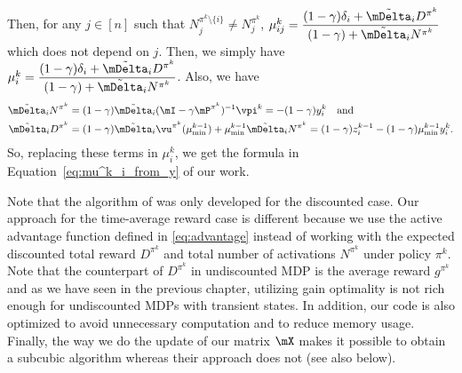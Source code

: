 Then, for any $j\in[n]$ such that $N_j^{\pi^k\setminus\{i\}}\neq N_j^{\pi^k}$, $\mu^k_{ij}=\displaystyle\frac{(1-\gamma)\delta_i +\tilde{\mDelta}_iD^{\pi^k}}{(1-\gamma) +\tilde{\mDelta}_iN^{\pi^k}}$ which does not depend on $j$.
Then, we simply have ${\mu^k_i=\displaystyle\frac{(1-\gamma)\delta_i +\tilde{\mDelta}_iD^{\pi^k}}{(1-\gamma) +\tilde{\mDelta}_iN^{\pi^k}}}$. %
Also, we have 
\begin{align*}
    \tilde{\mDelta}_iN^{\pi^k}&=(1-\gamma)\tilde{\mDelta}_i(\mI-\gamma \mP^{\pi^k})^{-1}\vpi^k=-(1-\gamma)y^k_i \quad\text{and}\\
    \tilde{\mDelta}_iD^{\pi^k}&={(1-\gamma)\tilde{\mDelta}_i\vu^{\pi^k}(\mu^{k-1}_{\min}) +\mu^{k-1}_{\min}\tilde{\mDelta}_i N^{\pi^k}} =(1-\gamma)z^{k-1}_i -(1-\gamma)\mu^{k-1}_{\min}y^k_i.
\end{align*}
So, replacing these terms in $\mu^k_i$, we get the formula in Equation~\eqref{eq:mu^k_i_from_y} of our work.

Note that the algorithm of \cite{akbarzadeh2020conditions} was only developed for the discounted case.  Our approach for the time-average reward case is different because we use the active advantage function defined in \eqref{eq:advantage} instead of working with the expected discounted total reward $D^{\pi^k}$ and total number of activations $N^{\pi^k}$ under policy $\pi^k$. 
Note that the counterpart of $D^{\pi^k}$ in undiscounted MDP is the average reward $g^{\pi^k}$ and as we have seen in the previous chapter, utilizing gain optimality is not rich enough for undiscounted MDPs with transient states.
In addition, our code is also optimized to avoid unnecessary computation and to reduce memory usage. Finally, the way we do the update of our matrix $\mX$ makes it possible to obtain a subcubic algorithm whereas their approach does not (see also below).

